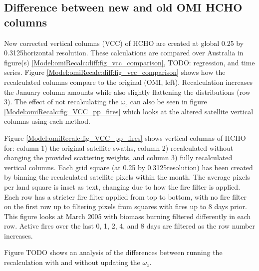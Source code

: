   \subsection{Difference between new and old OMI HCHO columns}
  
    
    New corrected vertical columns (VCC) of HCHO are created at global 0.25 by 0.3125\degr horizontal resolution.
    These calculations are compared over Australia in figure(s) \ref{Model:omiRecalc:diff:fig_vcc_comparison}, TODO: regression, and time series.
    Figure \ref{Model:omiRecalc:diff:fig_vcc_comparison} shows how the recalculated columns compare to the original (OMI, left). 
    Recalculation increases the January column amounts while also slightly flattening the distributions (row 3).
    The effect of not recalculating the $\omega_z$ can also be seen in figure \ref{Model:omiRecalc:fig_VCC_pp_fires} which looks at the altered satellite vertical columns using each method.
    
    Figure \ref{Model:omiRecalc:fig_VCC_pp_fires} shows vertical columns of HCHO for: column 1) the original satellite swaths, column 2) recalculated without changing the provided scattering weights, and column 3) fully recalculated vertical columns. 
    Each grid square (at 0.25 by 0.3125\degr resolution) has been created by binning the recalculated satellite pixels within the month.
    The average pixels per land square is inset as text, changing due to how the fire filter is applied.
    Each row has a stricter fire filter applied from top to bottom, with no fire filter on the first row up to filtering pixels from squares with fires up to 8 days prior.
    This figure looks at March 2005 with biomass burning filtered differently in each row.
    Active fires over the last 0, 1, 2, 4, and 8 days are filtered as the row number increases.
    
    
    Figure TODO shows an analysis of the differences between running the recalculation with and without updating the $\omega_z$.
    
